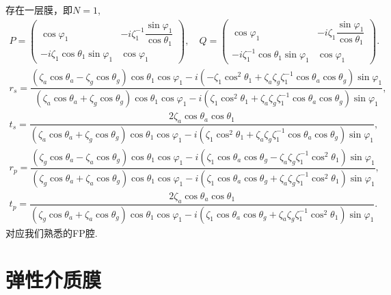 \begin{exbox}
	存在一层膜，即\(N = 1\),
	\begin{align*}
		P =
		\begin{pmatrix}
			\cos\varphi_1                        & -i\zeta_1^{-1}\dfrac{\sin\varphi_1}{\cos\theta_1} \\
			-i\zeta_1 \cos\theta_1 \sin\varphi_1 & \cos\varphi_1
		\end{pmatrix},\quad
		Q =
		\begin{pmatrix}
			\cos\varphi_1                             & -i\zeta_1\dfrac{\sin\varphi_1}{\cos\theta_1} \\
			-i\zeta_1^{-1} \cos\theta_1 \sin\varphi_1 & \cos\varphi_1
		\end{pmatrix}.
	\end{align*}
	\begin{align*}
		r_s = \dfrac{(\zeta_a \cos\theta_a - \zeta_g \cos\theta_g)\cos\theta_1 \cos\varphi_1 - i(-\zeta_1 \cos^2\theta_1 + \zeta_a\zeta_g\zeta_1^{-1}\cos\theta_a\cos\theta_g)\sin\varphi_1}{(\zeta_a \cos\theta_a + \zeta_g \cos\theta_g)\cos\theta_1 \cos\varphi_1 - i(\zeta_1 \cos^2\theta_1 + \zeta_a\zeta_g\zeta_1^{-1}\cos\theta_a\cos\theta_g)\sin\varphi_1},
	\end{align*}
	\begin{align*}
		t_s = \dfrac{2\zeta_a \cos\theta_a \cos\theta_1}{(\zeta_a \cos\theta_a + \zeta_g \cos\theta_g)\cos\theta_1 \cos\varphi_1 - i(\zeta_1 \cos^2\theta_1 + \zeta_a\zeta_g\zeta_1^{-1}\cos\theta_a\cos\theta_g)\sin\varphi_1},
	\end{align*}
	\begin{align*}
		r_p = \dfrac{(\zeta_g \cos\theta_a - \zeta_a \cos\theta_g)\cos\theta_1 \cos\varphi_1 - i(\zeta_1 \cos\theta_a\cos\theta_g - \zeta_a\zeta_g\zeta_1^{-1}\cos^2\theta_1)\sin\varphi_1}{(\zeta_g \cos\theta_a + \zeta_a \cos\theta_g)\cos\theta_1 \cos\varphi_1 - i(\zeta_1 \cos\theta_a\cos\theta_g + \zeta_a\zeta_g\zeta_1^{-1}\cos^2\theta_1)\sin\varphi_1},
	\end{align*}
	\begin{align*}
		t_p = \dfrac{2\zeta_a \cos\theta_a \cos\theta_1}{(\zeta_g \cos\theta_a + \zeta_a \cos\theta_g)\cos\theta_1 \cos\varphi_1 - i(\zeta_1 \cos\theta_a\cos\theta_g + \zeta_a\zeta_g\zeta_1^{-1}\cos^2\theta_1)\sin\varphi_1}.
	\end{align*}
	对应我们熟悉的FP腔.
\end{exbox}

\section{弹性介质膜}
